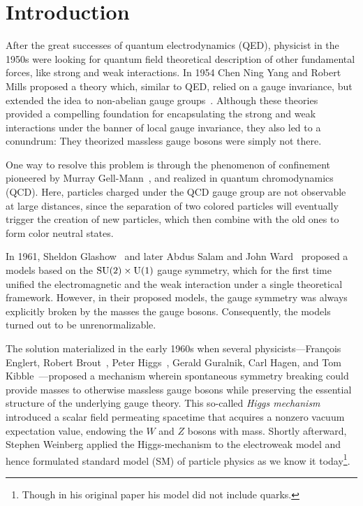 
\chapter{Introduction}\label{chap:one}

After the great successes of quantum electrodynamics (\acs{QED}), physicist in the 1950s were looking for quantum field theoretical description of other fundamental forces, like strong and weak interactions. In 1954 Chen Ning Yang and Robert Mills proposed a theory which, similar to \acs{QED}, relied on a gauge invariance, but extended the idea to non-abelian gauge groups~\cite{Yang:1954ek}. Although these theories provided a compelling foundation for encapsulating the strong and weak interactions under the banner of local gauge invariance, they also led to a conundrum: They theorized massless gauge bosons were simply not there.

One way to resolve this problem is through the phenomenon of confinement pioneered by Murray Gell-Mann~\cite{Gell-Mann:1961omu}, and realized in quantum chromodynamics (\acs{QCD}). Here, particles charged under the \acs{QCD} gauge group are not observable at large distances, since the separation of two colored particles will eventually trigger the creation of new particles, which then combine with the old ones to form color neutral states.

In 1961, Sheldon Glashow~\cite{Glashow:1961tr} and later Abdus Salam and John Ward~\cite{Salam:1964ry} proposed a models based on the $\mathrm{SU}(2)\times \mathrm{U}(1)$ gauge symmetry, which for the first time unified the electromagnetic and the weak interaction under a single theoretical framework. However, in their proposed models, the gauge symmetry was always explicitly broken by the masses the gauge bosons. Consequently, the models turned out to be unrenormalizable.

The solution materialized in the early 1960s when several physicists---François Englert, Robert Brout~\cite{Englert:1964et}, Peter Higgs~\cite{Higgs:1966ev}, Gerald Guralnik, Carl Hagen, and Tom Kibble~\cite{Guralnik:1964eu}---proposed a mechanism wherein spontaneous symmetry breaking could provide masses to otherwise massless gauge bosons while preserving the essential structure of the underlying gauge theory. This so-called \textit{Higgs mechanism} introduced a scalar field permeating spacetime that acquires a nonzero vacuum expectation value, endowing the $W$ and $Z$ bosons with mass. Shortly afterward, Stephen Weinberg applied the Higgs-mechanism to the electroweak model and hence formulated standard model (\acs{SM}) of particle physics as we know it today\footnote{Though in his original paper his model did not include quarks.}.

